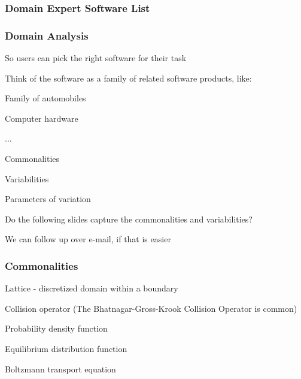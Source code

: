 \documentclass[t,12pt,numbers,fleqn]{beamer}
\begin{document}

\begin{frame}
\frametitle{Domain Expert Software List}


\end{frame}


\begin{frame}
\frametitle{Domain Analysis}

\bi
\item So users can pick the right software for their task
\item Think of the software as a family of related software products, like:
\bi
\item Family of automobiles
\item Computer hardware
\item ...
\ei
\item Commonalities
\item Variabilities
\item Parameters of variation
\item Do the following slides capture the commonalities and variabilities?
\item We can follow up over e-mail, if that is easier
\ei

\end{frame}


\begin{frame}
\frametitle{Commonalities}

\bi
	\item Lattice - discretized domain within a boundary
	\item Collision operator (The Bhatnagar-Gross-Krook Collision Operator is common)
	\item Probability density function
	\item Equilibrium distribution function
	\item Boltzmann transport equation
\ei

\end{frame}

\end{document}
